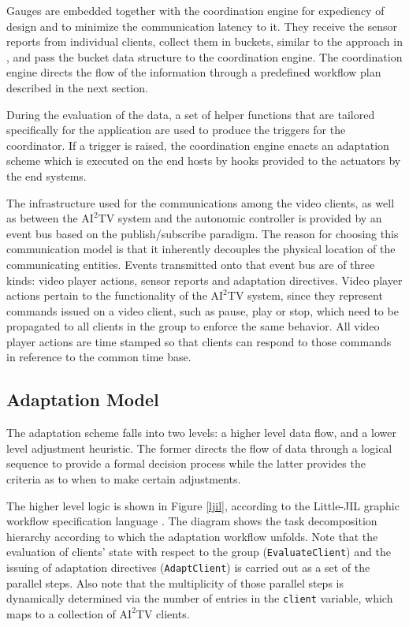 \documentclass{sig-alternate}
\begin{document}
Gauges are embedded together with the coordination engine for
expediency of design and to minimize the communication latency to it.
They receive the sensor reports from individual clients, collect them
in buckets, similar to the approach in \cite{MIMAZE}, and pass the
bucket data structure to the coordination engine.  The coordination
engine directs the flow of the information through a predefined
workflow plan described in the next section.

During the evaluation of the data, a set of helper functions that are
tailored specifically for the application are used to produce the
triggers for the coordinator.  If a trigger is raised, the
coordination engine enacts an adaptation scheme which is executed on
the end hosts by hooks provided to the actuators by the end systems.

The infrastructure used for the communications among the video
clients, as well as between the $\mathrm{AI}^2$TV system and the
autonomic controller is provided by an event bus based on the
publish/subscribe paradigm.  The reason for choosing this
communication model is that it inherently decouples the physical
location of the communicating entities.  Events transmitted onto that
event bus are of three kinds: video player actions, sensor reports and
adaptation directives.  Video player actions pertain to the
functionality of the $\mathrm{AI}^2$TV system, since they represent
commands issued on a video client, such as pause, play or stop, which
need to be propagated to all clients in the group to enforce the same
behavior.  All video player actions are time stamped so that clients
can respond to those commands in reference to the common time base.

\subsection{Adaptation Model}

The adaptation scheme falls into two levels: a higher level data flow,
and a lower level adjustment heuristic.  The former directs the flow
of data through a logical sequence to provide a formal decision
process while the latter provides the criteria as to when to make
certain adjustments.

The higher level logic is shown in Figure \ref{ljil}, according to the
Little-JIL graphic workflow specification language \cite{LJIL}.  The
diagram shows the task decomposition hierarchy according to which the
adaptation workflow unfolds.  Note that the evaluation of clients'
state with respect to the group (\texttt{EvaluateClient}) and the
issuing of adaptation directives (\texttt{AdaptClient}) is carried out
as a set of the parallel steps.  Also note that the multiplicity of
those parallel steps is dynamically determined via the number of
entries in the \texttt{client} variable, which maps to a collection of
$\mathrm{AI}^2$TV clients.
\end{document}
